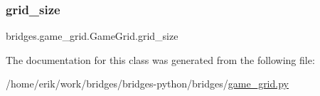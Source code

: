 \subsubsection{\texorpdfstring{grid\+\_\+size}{grid\_size}}
{\footnotesize\ttfamily bridges.\+game\+\_\+grid.\+Game\+Grid.\+grid\+\_\+size}



The documentation for this class was generated from the following file\+:\begin{DoxyCompactItemize}
\item 
/home/erik/work/bridges/bridges-\/python/bridges/\hyperlink{game__grid_8py}{game\+\_\+grid.\+py}\end{DoxyCompactItemize}
